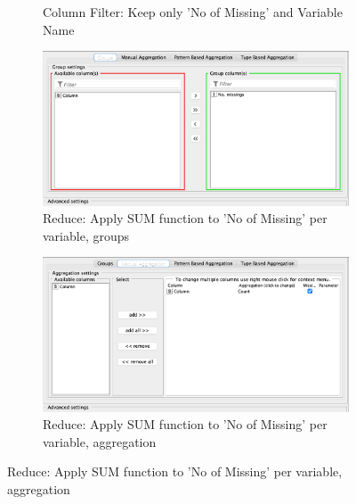 \documentclass[11pt]{article}
\begin{document}
\begin{figure}[H]
\begin{subfigure}{0.4\textwidth}
					\caption{Column Filter: Keep only 'No of Missing' and Variable Name}
					\label{fig:second}
				\end{subfigure}
				\hfill
				\begin{subfigure}{0.4\textwidth}
					\includegraphics[width=\textwidth]{res/t0/t01/t01-groupby-conf-1}
					\caption{Reduce: Apply SUM function to 'No of Missing' per variable, groups}
					\label{fig:third}
				\end{subfigure}	
				\hfill
				\begin{subfigure}{0.4\textwidth}
					\includegraphics[width=\textwidth]{res/t0/t01/t01-groupby-conf-2}
					\caption{Reduce: Apply SUM function to 'No of Missing' per variable, aggregation}
					\label{fig:third}
				\end{subfigure}	
				\label{fig:figures}
			\end{figure}
			\fi
			
\end{document}
